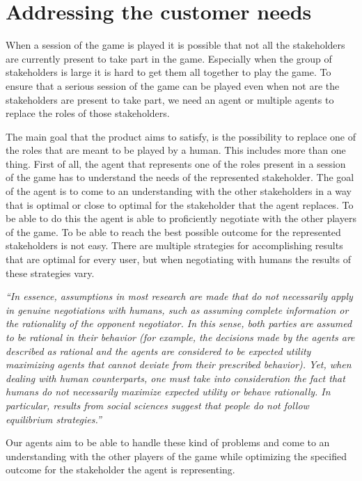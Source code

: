 \section{Addressing the customer needs}
When a session of the game is played it is possible that not all the stakeholders are currently present to take part in the game. Especially when the group of stakeholders is large it is hard to get them all together to play the game. To ensure that a serious session of the game can be played even when not are the stakeholders are present to take part, we need an agent or multiple agents to replace the roles of those stakeholders. 
\par
The main goal that the product aims to satisfy, is the possibility to replace one of the roles that are meant to be played by a human. This includes more than one thing. First of all, the agent that represents one of the roles present in a session of the game has to understand the needs of the represented stakeholder. The goal of the agent is to come to an understanding with the other stakeholders in a way that is optimal or close to optimal for the stakeholder that the agent replaces. To be able to do this the agent is able to proficiently negotiate with the other players of the game. To be able to reach the best possible outcome for the represented stakeholders is not easy. There are multiple strategies for accomplishing results that are optimal for every user, but when negotiating with humans the results of these strategies vary.

\par
\textit{ “In essence, assumptions in most research are made that do not necessarily apply in genuine negotiations with humans, such as assuming complete information or the rationality of the opponent negotiator. In this sense, both parties are assumed to be rational in their behavior (for example, the decisions made by the agents are described as rational and the agents are considered to be expected utility maximizing agents that cannot deviate from their prescribed behavior). Yet, when dealing with human counterparts, one must take into consideration the fact that humans do not necessarily maximize expected utility or behave rationally. In particular, results from social sciences suggest that people do not follow equilibrium strategies.”}\cite{cacm}

\par
Our agents aim to be able to handle these kind of problems and come to an understanding with the other players of the game while optimizing the specified outcome for the stakeholder the agent is representing.
